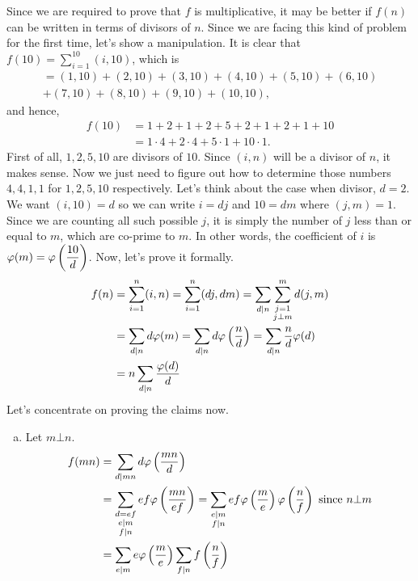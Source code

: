 \documentclass[problems.tex]{subfile}
\begin{document}
	\begin{solution}
		Since we are required to prove that $f$ is multiplicative, it may be better if $f(n)$ can be written in terms of divisors of $n$. Since we are facing this kind of problem for the first time, let's show a manipulation. It is clear that $f(10) = \sum_{i=1}^{10}(i,10)$, which is
			\begin{multline*}
					  = (1,10)+(2,10)+(3,10)+(4,10)+(5,10)+(6,10)\\+(7,10)+(8,10)+(9,10)+(10,10),
			\end{multline*}
		and hence,
			\begin{align*}
				f(10) & = 1+2+1+2+5+2+1+2+1+10\\
				& = 1\cdot4+2\cdot4+5\cdot1+10\cdot1.
			\end{align*}
		First of all, $1,2,5,10$ are divisors of $10$. Since $(i,n)$ will be a divisor of $n$, it makes sense. Now we just need to figure out how to determine those numbers $4,4,1,1$ for $1,2,5,10$ respectively. Let's think about the case when divisor, $d=2$. We want $(i,10)=d$ so we can write $i=dj$ and $10=dm$ where $(j,m)=1$. Since we are counting all such possible $j$, it is simply the number of $j$ less than or equal to $m$, which are co-prime to $m$. In other words, the coefficient of $i$ is $\varphi (m)=\varphi\left(\dfrac{10}{d}\right)$. Now, let's prove it formally.
			\begin{align*}
				f(n) & = \sum_{i=1}^{n}(i,n) = \sum_{i=1}^{n}(dj,dm)= \sum_{d|n}\sum_{\substack{j=1\\j\bot m}}^{m}d(j,m)\\
					 & = \sum_{d|n}d\varphi (m) = \sum_{d|n}d\varphi\left(\dfrac{n}{d}\right)  = \sum_{d|n}\dfrac{n}{d}\varphi (d)\\
					 & = n\sum_{d|n}\dfrac{\varphi (d)}{d}
			\end{align*}
		Let's concentrate on proving the claims now.
			\begin{enumerate}[(a)]
				\item Let $m\bot n$.
						\begin{align*}
							f(mn) & = \sum_{d|mn}d\t\left(\dfrac{mn}{d}\right)\\
								  & = \sum_{\substack{d=ef\\e|m\\f|n}}ef\t\left(\dfrac{mn}{ef}\right)  = \sum_{\substack{e|m\\f|n}}ef\t\left(\dfrac{m}{e}\right)\t\left(\dfrac{n}{f}\right)\text { since }n\bot m\\
								  & = \sum_{e|m}e\t \left(\dfrac{m}{e}\right)\sum_{f|n}f\left(\dfrac{n}{f}\right)\\

\end{align*}
\end{enumerate}
\end{solution}
\end{document}
